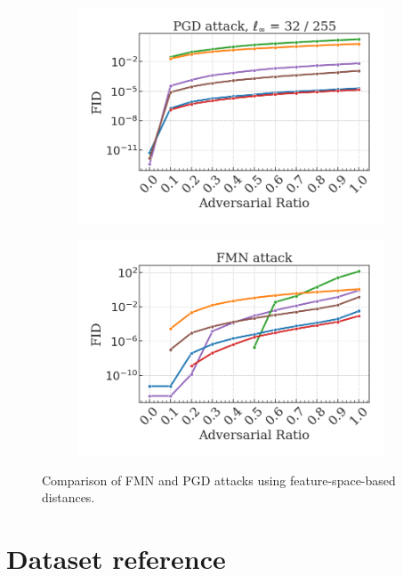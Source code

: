 \begin{figure}[H]
    \begin{subfigure}[b]{0.45\textwidth}
        \centering
        \includegraphics[width=\textwidth]{img/results_discussion/adversarial/PGD_FID.png}
    \end{subfigure}
    \hfill
    \begin{subfigure}[b]{0.45\textwidth}
        \centering
        \includegraphics[width=\textwidth]{img/results_discussion/adversarial/FMN_FID.png}
    \end{subfigure}

    \caption{Comparison of FMN and PGD attacks using feature-space-based distances.}
    \label{fig:comparison_feat_metrics}
\end{figure}


\chapter{Dataset reference}\label{sec:datasets}

